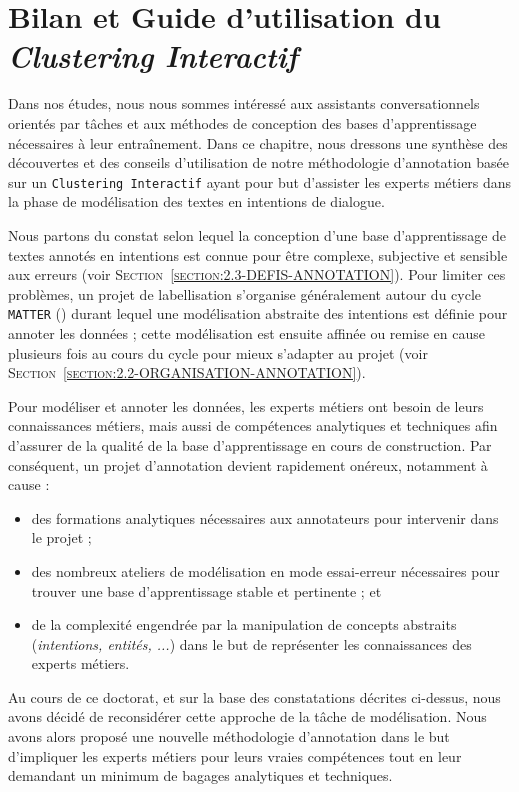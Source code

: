 \chapter{Bilan et Guide d'utilisation du \textit{Clustering Interactif}}
\label{chapter:5-GUIDE}
	
	Dans nos études, nous nous sommes intéressé aux assistants conversationnels orientés par tâches et aux méthodes de conception des bases d'apprentissage nécessaires à leur entraînement.
	Dans ce chapitre, nous dressons une synthèse des découvertes et des conseils d'utilisation de notre méthodologie d'annotation basée sur un \texttt{Clustering Interactif} ayant pour but d'assister les experts métiers dans la phase de modélisation des textes en intentions de dialogue.
	
	\begin{leftBarReminder}
		Nous partons du constat selon lequel la conception d'une base d'apprentissage de textes annotés en intentions est connue pour être complexe, subjective et sensible aux erreurs (voir \textsc{Section~\ref{section:2.3-DEFIS-ANNOTATION}}).
		Pour limiter ces problèmes, un projet de labellisation s'organise généralement autour du cycle \texttt{MATTER} (\cite{pustejovsky-stubbs:2012:natural-language-annotation}) durant lequel une modélisation abstraite des intentions est définie pour annoter les données ; cette modélisation est ensuite affinée ou remise en cause plusieurs fois au cours du cycle pour mieux s'adapter au projet (voir \textsc{Section~\ref{section:2.2-ORGANISATION-ANNOTATION}}).
		
		Pour modéliser et annoter les données, les experts métiers ont besoin de leurs connaissances métiers, mais aussi de compétences analytiques et techniques afin d'assurer de la qualité de la base d'apprentissage en cours de construction.
		Par conséquent, un projet d'annotation devient rapidement onéreux, notamment à cause :
		\begin{itemize}
			\item des formations analytiques nécessaires aux annotateurs pour intervenir dans le projet ;
			\item des nombreux ateliers de modélisation en mode essai-erreur nécessaires pour trouver une base d'apprentissage stable et pertinente ; et
			\item de la complexité engendrée par la manipulation de concepts abstraits (\textit{intentions, entités, ...}) dans le but de représenter les connaissances des experts métiers.
		\end{itemize}
		
		Au cours de ce doctorat, et sur la base des constatations décrites ci-dessus, nous avons décidé de reconsidérer cette approche de la tâche de modélisation.
		Nous avons alors proposé une nouvelle méthodologie d'annotation dans le but d'impliquer les experts métiers pour leurs vraies compétences tout en leur demandant un minimum de bagages analytiques et techniques.
	\end{leftBarReminder}
	
